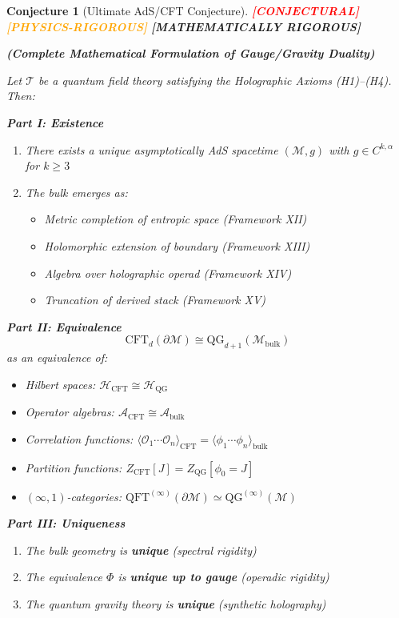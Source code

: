 \documentclass[12pt,a4paper]{article}
\newtheorem{conjecture}[theorem]{Conjecture}
\newcommand{\rigormark}[1]{%
  \ifcase#1
    \textcolor{red}{\textbf{[CONJECTURAL]}}%
  \or
    \textcolor{orange}{\textbf{[PHYSICS-RIGOROUS]}}%
  \or
    \textcolor{green!50!black}{\textbf{[MATHEMATICALLY RIGOROUS]}}%
  \fi
}
\begin{document}
\begin{conjecture}[Ultimate AdS/CFT Conjecture]\label{thm:ultimate-adscft}
\rigormark{2}

\textbf{(Complete Mathematical Formulation of Gauge/Gravity Duality)}

Let $\mathcal{T}$ be a quantum field theory satisfying the Holographic Axioms (H1)--(H4). Then:

\textbf{Part I: Existence}
\begin{enumerate}
    \item There exists a unique asymptotically AdS spacetime $(\mathcal{M}, g)$ with $g \in C^{k,\alpha}$ for $k \geq 3$
    \item The bulk emerges as:
    \begin{itemize}
        \item Metric completion of entropic space (Framework XII)
        \item Holomorphic extension of boundary (Framework XIII)
        \item Algebra over holographic operad (Framework XIV)
        \item Truncation of derived stack (Framework XV)
    \end{itemize}
\end{enumerate}

\textbf{Part II: Equivalence}
\begin{equation}
\boxed{\text{CFT}_d(\partial\mathcal{M}) \cong \text{QG}_{d+1}(\mathcal{M}_{\text{bulk}})}
\end{equation}
as an equivalence of:
\begin{itemize}
    \item Hilbert spaces: $\mathcal{H}_{\text{CFT}} \cong \mathcal{H}_{\text{QG}}$
    \item Operator algebras: $\mathcal{A}_{\text{CFT}} \cong \mathcal{A}_{\text{bulk}}$
    \item Correlation functions: $\langle \mathcal{O}_1 \cdots \mathcal{O}_n \rangle_{\text{CFT}} = \langle \phi_1 \cdots \phi_n \rangle_{\text{bulk}}$
    \item Partition functions: $Z_{\text{CFT}}[J] = Z_{\text{QG}}[\phi_0 = J]$
    \item $(\infty, 1)$-categories: $\text{QFT}^{(\infty)}(\partial\mathcal{M}) \simeq \text{QG}^{(\infty)}(\mathcal{M})$
\end{itemize}

\textbf{Part III: Uniqueness}
\begin{enumerate}
    \item The bulk geometry is \textbf{unique} (spectral rigidity)
    \item The equivalence $\Phi$ is \textbf{unique up to gauge} (operadic rigidity)
    \item The quantum gravity theory is \textbf{unique} (synthetic holography)
\end{enumerate}


\end{conjecture}
\end{document}
